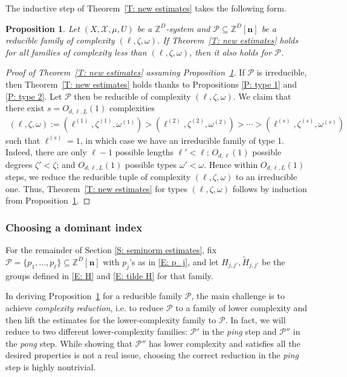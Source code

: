 \documentclass[11pt]{amsart}
\newtheorem{proposition}[lemma]{Proposition}
\theoremstyle{definition}
\newcommand{\Z}{{\mathbb Z}}
\newcommand{\CP}{{\mathcal P}}
\newcommand{\CX}{{\mathcal X}}
\newcommand{\bn}{{\mathbf{n}}}
\newcommand{\1}{{\mathbf{1}}}
\begin{document}
The inductive step of Theorem~\ref{T: new estimates} takes the following form.
\begin{proposition}\label{P: estimates for reducible families}
    Let $(X, \CX, \mu, U)$ be a $\Z^D$-system and $\CP\subseteq\Z^D[\bn]$ be a reducible family of complexity $(\ell, \zeta, \omega)$. If Theorem~\ref{T: new estimates} holds for all families of complexity less than $(\ell, \zeta, \omega)$, then it also holds for $\CP$.
\end{proposition}
\begin{proof}[Proof of Theorem~\ref{T: new estimates} assuming Proposition~\ref{P: estimates for reducible families}]
    If $\CP$ is irreducible, then Theorem~\ref{T: new estimates} holds thanks to Propositions \ref{P: type 1} and \ref{P: type 2}. Let $\CP$ then be reducible of complexity $(\ell, \zeta, \omega)$.
    We claim that there exist $s=O_{d,\ell,L}(1)$ complexities
    \begin{align*}
        (\ell, \zeta, \omega) := (\ell^{(1)}, \zeta^{(1)}, \omega^{(1)})>(\ell^{(2)}, \zeta^{(2)}, \omega^{(2)}) > \cdots > (\ell^{(s)}, \zeta^{(s)}, \omega^{(s)})
    \end{align*}
    such that $\ell^{(s)} = 1$, in which case we have an irreducible family of type 1. Indeed, there are only $\ell-1$ possible lengths $\ell'<\ell$; $O_{d,\ell}(1)$ possible degrees $\zeta'<\zeta$; and $O_{d,\ell,L}(1)$ possible types $\omega'<\omega$. Hence within $O_{d,\ell,L}(1)$ steps, we reduce the reducible tuple of complexity $(\ell, \zeta, \omega)$ to an irreducible one. Thus, Theorem~\ref{T: new estimates} for types $(\ell, \zeta, \omega)$ follows by induction from Proposition~\ref{P: estimates for reducible families}.
\end{proof}

\subsubsection{Choosing a dominant index}\label{SS: dominant index}

{For the remainder of Section \ref{S: seminorm estimates}, fix  $\CP = \{p_1, \ldots, p_\ell\}\subseteq\Z^D[\bn]$ with $p_j$'s as in \eqref{E: p_j}, and let $H_{j,j'}, \tilde H_{j,j'}$ be the groups defined in \eqref{E: H} and \eqref{E: tilde H} for that family.}

In deriving Proposition~\ref{P: estimates for reducible families} for a reducible family $\CP$, the main challenge is to achieve \textit{complexity reduction}, i.e. to reduce $\CP$ to a family of lower complexity and then lift the estimates for the lower-complexity family to $\CP$. In fact, we will reduce to two different lower-complexity families: $\CP'$ in the \textit{ping} step and $\CP''$ in the \textit{pong} step. While showing that $\CP''$ has lower complexity and satisfies all the desired properties is not a real issue, choosing the correct reduction in the \textit{ping} step is highly nontrivial.
\end{document}
